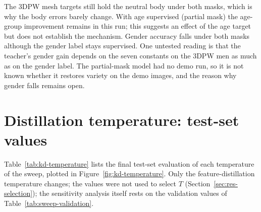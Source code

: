 The 3DPW mesh targets still hold the neutral body under both masks, which is why the body errors barely change. With
age supervised (partial mask) the age-group improvement remains in this run; this suggests an effect of the age
target but does not establish the mechanism. Gender accuracy falls under both masks although the gender label stays
supervised. One untested reading is that the teacher's gender gain depends on the seven constants on the 3DPW men as
much as on the gender label. The partial-mask model had no demo run, so it is not known whether it restores variety on
the demo images, and the reason why gender falls remains open.

\section{Distillation temperature: test-set values}



Table~\ref{tab:kd-temperature} lists the final test-set evaluation of each temperature of the sweep, plotted in
Figure~\ref{fig:kd-temperature}. Only the feature-distillation temperature changes; the values were not used to
select $T$ (Section~\ref{sec:res-selection}); the sensitivity analysis itself rests on the validation values of
Table~\ref{tab:sweep-validation}.
